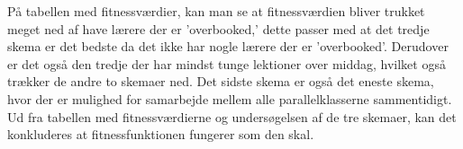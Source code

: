På tabellen med fitnessværdier, kan man se at fitnessværdien bliver trukket meget ned af have lærere der er ’overbooked,’ dette passer med at det tredje skema er det bedste da det ikke har nogle lærere der er ’overbooked’. Derudover er det også den tredje der har mindst tunge lektioner over middag, hvilket også trækker de andre to skemaer ned. Det sidste skema er også det eneste skema, hvor der er mulighed for samarbejde mellem alle parallelklasserne sammentidigt. 
Ud fra tabellen med fitnessværdierne og undersøgelsen af de tre skemaer, kan det konkluderes at fitnessfunktionen fungerer som den skal. 
